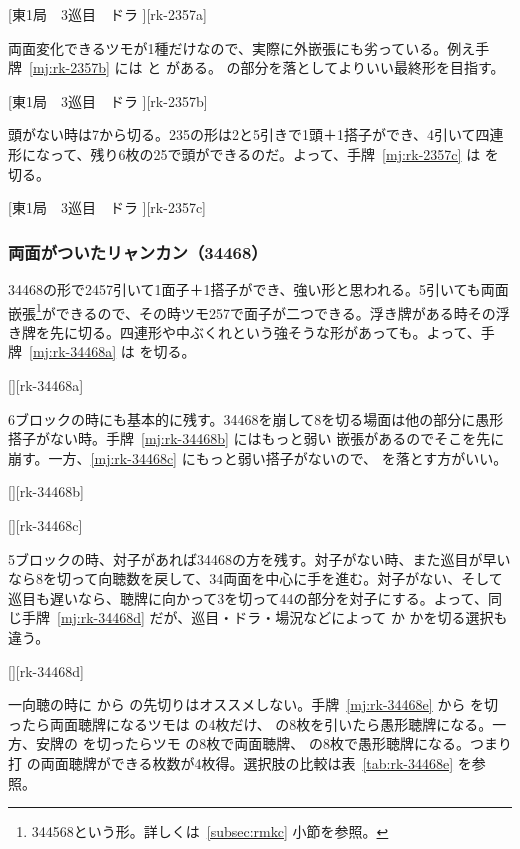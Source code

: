 \documentclass[../nankiru_main.tex]{subfiles}
\begin{document}
[東1局　3巡目　ドラ ][rk-2357a]

両面変化できるツモが1種だけなので、実際に外嵌張にも劣っている。例え手牌~\ref{mj:rk-2357b} には  と  がある。 の部分を落としてよりいい最終形を目指す。

[東1局　3巡目　ドラ ][rk-2357b]

頭がない時は7から切る。235の形は2と5引きで1頭＋1搭子ができ、4引いて四連形になって、残り6枚の25で頭ができるのだ。よって、手牌~\ref{mj:rk-2357c} は  を切る。

[東1局　3巡目　ドラ ][rk-2357c]


\subsubsection*{両面がついたリャンカン（34468）}

34468の形で2457引いて1面子＋1搭子ができ、強い形と思われる\citep{clearrain-34468}。5引いても両面嵌張\footnote{344568という形。詳しくは~\ref{subsec:rmkc} 小節を参照。}ができるので、その時ツモ257で面子が二つできる\citep{yuusee-34468}。浮き牌がある時その浮き牌を先に切る。四連形や中ぶくれという強そうな形があっても。よって、手牌~\ref{mj:rk-34468a} は  を切る。

[][rk-34468a]

6ブロックの時にも基本的に残す。34468を崩して8を切る場面は他の部分に愚形搭子がない時。手牌~\ref{mj:rk-34468b} にはもっと弱い  嵌張があるのでそこを先に崩す。一方、\ref{mj:rk-34468c} にもっと弱い搭子がないので、 を落とす方がいい。

[][rk-34468b]

[][rk-34468c]

5ブロックの時、対子があれば34468の方を残す。対子がない時、また巡目が早いなら8を切って向聴数を戻して、34両面を中心に手を進む。対子がない、そして巡目も遅いなら、聴牌に向かって3を切って44の部分を対子にする。よって、同じ手牌~\ref{mj:rk-34468d} だが、巡目・ドラ・場況などによって  か  かを切る選択も違う。

[][rk-34468d]

一向聴の時に  から  の先切りはオススメしない\citep{yuusee-13556}。手牌~\ref{mj:rk-34468e} から  を切ったら両面聴牌になるツモは  の4枚だけ、 の8枚を引いたら愚形聴牌になる。一方、安牌の  を切ったらツモ  の8枚で両面聴牌、 の8枚で愚形聴牌になる。つまり打  の両面聴牌ができる枚数が4枚得。選択肢の比較は表~\ref{tab:rk-34468e} を参照。
\end{document}
